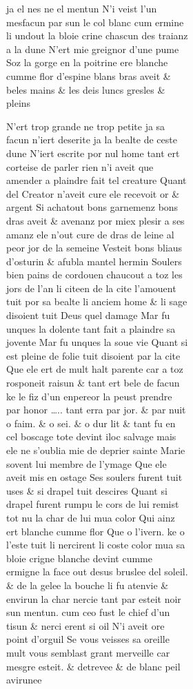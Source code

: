 \documentclass[
  letterpaper,
  DIV=11,
  numbers=noendperiod,
  oneside]{scrreprt}
\begin{document}
\begin{figure}
\begin{figure}
\begin{figure}
\begin{minipage}{0.20\linewidth}
{ja} el nes {ne} el mentun {N'}i veist l'un mesfacun par sun le col
{blanc cum ermine} li undout la {bloie} crine chascun des traianz a la
dune {N'ert mie greignor} d'une pume Soz la gorge en la poitrine ere
{blanche cumme flor d'espine} {blans bras} aveit \& {beles} mains \& les
deis luncs gresles \& pleins

{N'ert trop grande ne trop petite} {ja} sa facun {n'}iert deserite {ja}
la bealte de ceste dune {N'}iert escrite por {nul} home tant ert
corteise de parler {rien n'}i aveit que amender a plaindre fait tel
creature Quant del Creator {n'}aveit cure {ele recevoit {or} \&
{argent}} Si achatout bons garnemenz bons dras aveit \& avenanz por miex
plesir a ses amanz ele {n'}out cure de dras de leine al peor jor de la
semeine Vesteit bons bliaus {d'osturin} \& afubla mantel hermin Soulers
{bien pains} de cordouen chaucout a toz les jors de l'an li citeen de la
cite l'amouent tuit por sa bealte li anciem home \& li sage disoient
tuit Deus quel damage Mar fu unques la dolente tant fait a plaindre sa
jovente Mar fu unques la soue vie Quant si est pleine de folie tuit
disoient par la cite Que ele ert de mult halt parente car a toz
rosponeit raisun \& tant ert bele de facun ke le fiz d'un enpereor la
peust prendre par honor \ldots.. tant erra par jor. \& par nuit o faim.
\& o sei. \& o dur lit \& tant fu en cel boscage tote devint iloc
salvage mais ele {ne} s'oublia {mie} de deprier sainte Marie sovent lui
membre de l'ymage Que ele aveit mis en ostage Ses soulers furent tuit
uses \& si drapel tuit descires Quant si drapel furent rumpu le cors de
lui remist tot nu la char de lui {mua color} Qui ainz ert {blanche cumme
flor} Que o l'ivern. ke o l'este tuit li {nercirent} li coste {color mua
sa bloie crigne} {blanche devint cumme ermigne} la face out desus
{bruslee} del soleil. \& de la gelee la bouche li fu atenvie \& envirun
la char {nercie} tant par esteit {noir} sun mentun. {cum ceo fust le
chief d'un tisun} \& {nerci} erent si oil {N'}i aveit ore {point
d'}orguil Se vous veisses sa oreille mult vous semblast grant merveille
car mesgre esteit. \& detrevee \& de {blanc} peil avirunee


\end{minipage}
\end{figure}
\end{figure}
\end{figure}
\end{document}
